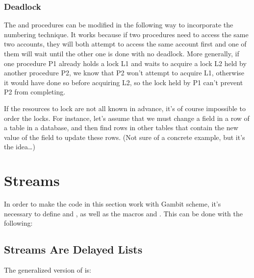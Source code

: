 \subsubsection{Deadlock}

\begin{exe}[3.48]
    The  and  
    procedures can be modified in the following way to incorporate the numbering 
    technique. It works because if two procedures need to access the same two 
    accounts, they will both attempt to access the same account first and one of 
    them will wait until the other one is done with no deadlock. More generally, 
    if one procedure P1 already holds a lock L1 and waits to acquire a lock L2 
    held by another procedure P2, we know that P2 won’t attempt to acquire L1, 
    otherwise it would have done so before acquiring L2, so the lock held by P1 
    can’t prevent P2 from completing.
\end{exe}

\begin{exe}[3.49]
    If the resources to lock are not all known in advance, it’s of course 
    impossible to order the locks. For instance, let’s assume that we must 
    change a field in a row of a table in a database, and then find rows in 
    other tables that contain the new value of the field to update these rows. 
    (Not sure of a concrete example, but it’s the idea…)
\end{exe}

\section{Streams}

\begin{comp}
    In order to make the code in this section work with Gambit scheme, it’s 
    necessary to define  and , as well 
    as the macros  and . This can be done with the 
    following:
\end{comp}

\subsection{Streams Are Delayed Lists}

\begin{exe}[3.50]
    The generalized version of  is:
\end{exe}

